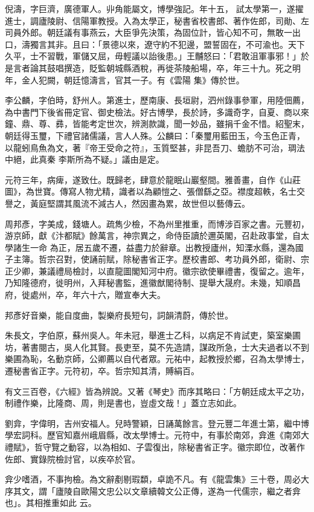 \begin{pinyinscope}
 倪濤，字巨濟，廣德軍人。丱角能屬文，博學強記。年十五，
 試太學第一，遂擢進士，調廬陵尉、信陽軍教授。入為太學正，秘書省校書郎、著作佐郎，司勛、左司員外郎。朝廷議有事燕云，大臣爭先決策，為固位計，皆心知不可，無敢一出口，濤獨言其非。且曰：「景德以來，遼守約不犯邊，盟誓固在，不可渝也。天下久平，士不習戰，軍儲又屈，毋輕議以詒後患。」王黼怒曰：「君敢沮軍事邪！」於是言者論其鼓唱撰造，貶監朝城縣酒稅，再徙茶陵船場，卒，年三十九。死之明年，金人犯闕，朝廷憶濤言，官其一子。有《雲陽
 集》傳於世。



 李公麟，字伯時，舒州人。第進士，歷南康、長垣尉，泗州錄事參軍，用陸佃薦，為中書門下後省冊定官、御史檢法。好古博學，長於詩，多識奇字，自夏、商以來鐘、鼎、尊、彞，皆能考定世次，辨測款識，聞一妙品，雖捐千金不惜。紹聖末，朝廷得玉璽，下禮官諸儒議，言人人殊。公麟曰：「秦璽用藍田玉，今玉色正青，以龍蚓鳥魚為文，著『帝王受命之符』，玉質堅甚，非昆吾刀、蟾肪不可治，琱法中絕，此真秦
 李斯所為不疑。」議由是定。



 元符三年，病痺，遂致仕。既歸老，肆意於龍眠山巖壑間。雅善畫，自作《山莊圖》，為世寶。傳寫人物尤精，識者以為顧愷之、張僧繇之亞。襟度超軼，名士交譽之，黃庭堅謂其風流不減古人，然因畫為累，故世但以藝傳云。



 周邦彥，字美成，錢塘人。疏雋少檢，不為州里推重，而博涉百家之書。元豐初，游京師，獻《汴都賦》餘萬言，神宗異之，命侍臣讀於邇英閣，召赴政事堂，自太學諸生一命
 為正，居五歲不遷，益盡力於辭章。出教授廬州，知溧水縣，還為國子主簿。哲宗召對，使誦前賦，除秘書省正字。歷校書郎、考功員外郎，衛尉、宗正少卿，兼議禮局檢討，以直龍圖閣知河中府。徽宗欲使畢禮書，復留之。逾年，乃知隆德府，徙明州，入拜秘書監，進徽猷閣待制、提舉大晟府。未幾，知順昌府，徙處州，卒，年六十六，贈宣奉大夫。



 邦彥好音樂，能自度曲，製樂府長短句，詞韻清蔚，傳於世。



 朱長文，字伯原，蘇州吳人。年未冠，舉進士乙科，以病足不肯試吏，築室樂圃坊，著書閱古，吳人化其賢。長吏至，莫不先造請，謀政所急，士大夫過者以不到樂圃為恥，名動京師，公卿薦以自代者眾。元祐中，起教授於鄉，召為太學博士，遷秘書省正字。元符初，卒。哲宗知其清，賻絹百。



 有文三百卷，《六經》皆為辨說。又著《琴史》而序其略曰：「方朝廷成太平之功，制禮作樂，比隆商、周，則是書也，豈虛文哉！」蓋立志如此。



 劉弇，字偉明，吉州安福人。兒時警穎，日誦萬餘言。登元豐二年進士第，繼中博學宏詞科。歷官知嘉州峨眉縣，改太學博士。元符中，有事於南郊，弇進《南郊大禮賦》，哲守覽之動容，以為相如、子雲復出，除秘書省正字。徽宗即位，改著作佐郎、實錄院檢討官，以疾卒於官。



 弇少嗜酒，不事拘檢。為文辭剷剔瑕纇，卓詭不凡。有《龍雲集》三十卷，周必大序其文，謂「廬陵自歐陽文忠公以文章續韓文公正傳，遂為一代儒宗，繼之者弇也」。其相推重如此
 云。



\end{pinyinscope}